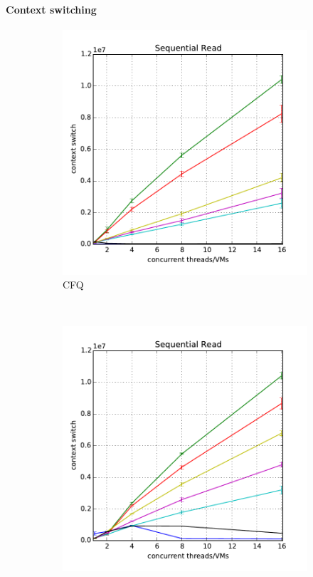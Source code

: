 \documentclass{acmsig}
\begin{document}
\paragraph{Context switching}
\begin{figure}[t]
   \centering
   \begin{subfigure}[b]{0.3\textwidth}
     \includegraphics[width=\textwidth]{figures/contextswitching_cfq_read.pdf}
     \caption{CFQ}
     \label{fig:contextswitching_cfq_read}
   \end{subfigure}%
   ~ %
   \begin{subfigure}[b]{0.3\textwidth}
     \includegraphics[width=\textwidth]{figures/contextswitching_deadline_read.pdf}

\end{subfigure}
\end{figure}
\end{document}
